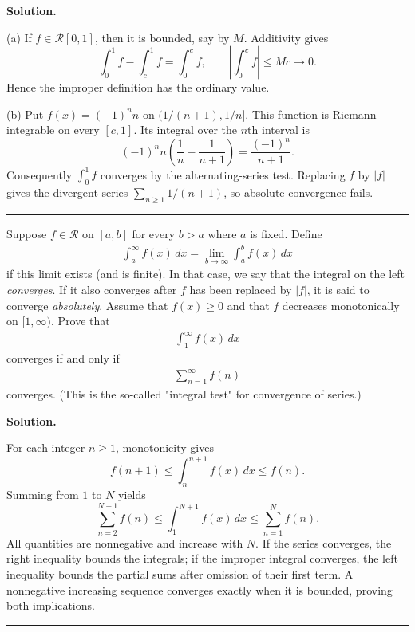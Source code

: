 \documentclass[12pt]{article}
\theoremstyle{definition}
\begin{document}
\smallskip
\noindent\textbf{Solution.}\quad


(a) If $f\in\mathcal R[0,1]$, then it is bounded, say by $M$.  Additivity gives
\[
 \int_0^1f-\int_c^1f=\int_0^c f,
 \qquad \left|\int_0^c f\right|\le Mc\longrightarrow0.
\]
Hence the improper definition has the ordinary value.

(b) Put $f(x)=(-1)^n n$ on $(1/(n+1),1/n]$.  This function is Riemann integrable on every $[c,1]$.  Its integral over the $n$th interval is
\[
 (-1)^n n\left(\frac1n-\frac1{n+1}\right)=\frac{(-1)^n}{n+1}.
\]
Consequently $\int_0^1f$ converges by the alternating-series test.  Replacing $f$ by $|f|$ gives the divergent series $\sum_{n\ge1}1/(n+1)$, so absolute convergence fails.




\bigskip\noindent\hrule\bigskip

Suppose $f\in\mathcal{R}$ on $[a,b]$ for every $b>a$ where $a$ is fixed. Define
\begin{align*}
\int_a^\infty f(x)\,dx=\lim_{b\to\infty}\int_a^bf(x)\,dx
\end{align*}
if this limit exists (and is finite). In that case, we say that the integral on the left \textit{converges}. If it also converges after $f$ has been replaced by $\left\vert f\right\vert$, it is said to converge \textit{absolutely}.
Assume that $f(x)\ge 0$ and that $f$ decreases monotonically on $[1,\infty)$. Prove that
\begin{align*}
\int_1^\infty f(x)\,dx
\end{align*}
converges if and only if
\begin{align*}
\sum_{n=1}^\infty f(n)
\end{align*}
converges. (This is the so-called "integral test" for convergence of series.)

\smallskip
\noindent\textbf{Solution.}\quad


For each integer $n\ge1$, monotonicity gives
\[
 f(n+1)\le \int_n^{n+1}f(x)\,dx\le f(n).
\]
Summing from $1$ to $N$ yields
\[
 \sum_{n=2}^{N+1}f(n)\le\int_1^{N+1}f(x)\,dx
 \le\sum_{n=1}^{N}f(n).
\]
All quantities are nonnegative and increase with $N$.  If the series converges, the right inequality bounds the integrals; if the improper integral converges, the left inequality bounds the partial sums after omission of their first term.  A nonnegative increasing sequence converges exactly when it is bounded, proving both implications.




\bigskip\noindent\hrule\bigskip
\end{document}
